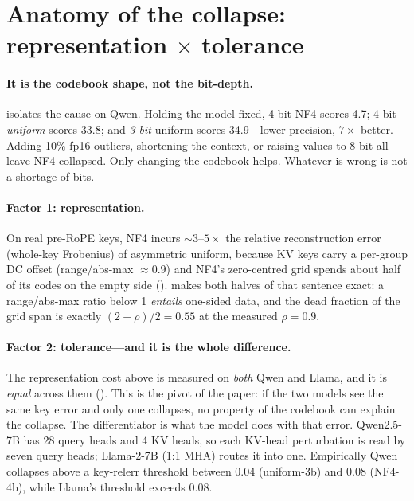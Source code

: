 \documentclass{article}
\theoremstyle{plain}
\theoremstyle{definition}
\begin{document}
\section{Anatomy of the collapse: representation \texorpdfstring{$\times$}{x} tolerance}
\label{sec:anatomy}

\paragraph{It is the codebook shape, not the bit-depth.}
 isolates the cause on Qwen. Holding the model fixed, 4-bit NF4 scores 4.7;
4-bit \emph{uniform} scores 33.8; and \emph{3-bit} uniform scores 34.9---lower precision,
$7\times$ better. Adding 10\% fp16 outliers, shortening the context, or raising values to 8-bit
all leave NF4 collapsed. Only changing the codebook helps. Whatever is wrong is not a shortage
of bits.

\paragraph{Factor 1: representation.}
On real pre-RoPE keys, NF4 incurs ${\sim}3$--$5\times$ the relative reconstruction error
(whole-key Frobenius) of asymmetric uniform, because KV keys carry a per-group DC offset
(range/abs-max $\approx 0.9$) and NF4's zero-centred grid spends about half of its codes on the
empty side ().  makes both halves of that sentence exact:
a range/abs-max ratio below 1 \emph{entails} one-sided data, and the dead fraction of the grid
span is exactly $(2-\rho)/2 = 0.55$ at the measured $\rho = 0.9$.

\paragraph{Factor 2: tolerance---and it is the whole difference.}
The representation cost above is measured on \emph{both} Qwen and Llama, and it is
\emph{equal} across them (). This is the pivot of the paper: if the two
models see the same key error and only one collapses, no property of the codebook can explain
the collapse. The differentiator is what the model does with that error. Qwen2.5-7B has 28
query heads and 4 KV heads, so each KV-head perturbation is read by seven query heads;
Llama-2-7B (1:1 MHA) routes it into one. Empirically Qwen collapses above a key-relerr
threshold between 0.04 (uniform-3b) and 0.08 (NF4-4b), while Llama's threshold exceeds 0.08.
\end{document}
